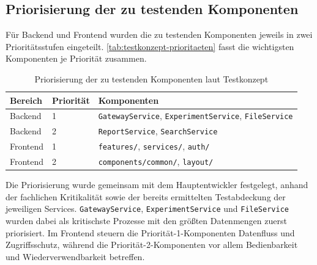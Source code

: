 \subsection{Priorisierung der zu testenden Komponenten}
Für Backend und Frontend wurden die zu testenden Komponenten jeweils in zwei Prioritätsstufen eingeteilt. \autoref{tab:testkonzept-prioritaeten} fasst die wichtigsten Komponenten je Priorität zusammen.

\begin{table}[H]
    \centering
    \caption{Priorisierung der zu testenden Komponenten laut Testkonzept}
    \label{tab:testkonzept-prioritaeten}
    \renewcommand{\arraystretch}{1.3}
    \begin{tabularx}{\textwidth}{@{}llX@{}}
        \toprule
        \textbf{Bereich} & \textbf{Priorität} & \textbf{Komponenten} \\
        \midrule
        Backend & 1 & \texttt{GatewayService}, \texttt{ExperimentService}, \texttt{FileService} \\
        \addlinespace
        Backend & 2 & \texttt{ReportService}, \texttt{SearchService} \\
        \addlinespace
        Frontend & 1 & \texttt{features/}, \texttt{services/}, \texttt{auth/} \\
        \addlinespace
        Frontend & 2 & \texttt{components/common/}, \texttt{layout/} \\
        \bottomrule
    \end{tabularx}
\end{table}

Die Priorisierung wurde gemeinsam mit dem Hauptentwickler festgelegt, anhand der fachlichen Kritikalität sowie der bereits ermittelten Testabdeckung der jeweiligen Services. \texttt{GatewayService}, \texttt{ExperimentService} und \texttt{FileService} wurden dabei als kritischste Prozesse mit den größten Datenmengen zuerst priorisiert. Im Frontend steuern die Priorität-1-Komponenten Datenfluss und Zugriffsschutz, während die Priorität-2-Komponenten vor allem Bedienbarkeit und Wiederverwendbarkeit betreffen.

